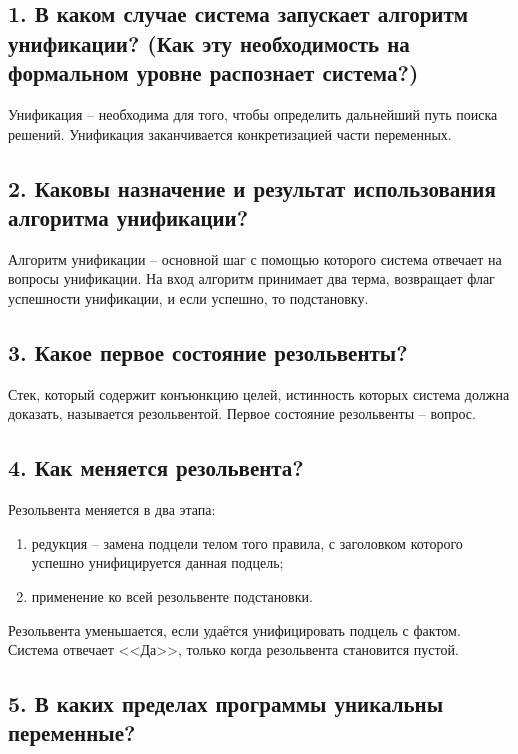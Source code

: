 \subsection*{1. В каком случае система запускает алгоритм унификации? (Как эту необходимость на формальном уровне распознает система?)}

Унификация – необходима для того, чтобы определить дальнейший путь поиска решений. Унификация заканчивается конкретизацией части переменных.

\subsection*{2. Каковы назначение и результат использования алгоритма унификации?}

Алгоритм унификации -- основной шаг с помощью которого система отвечает на вопросы унификации. На вход алгоритм принимает два терма, возвращает флаг успешности унификации, и если успешно, то подстановку.

\subsection*{3. Какое первое состояние резольвенты?}

Стек, который содержит конъюнкцию целей, истинность которых система должна доказать, называется резольвентой. Первое состояние резольвенты -- вопрос.

\subsection*{4. Как меняется резольвента?}

Резольвента меняется в два этапа:

\begin{enumerate}
	\item редукция -- замена подцели телом того правила, с заголовком которого успешно унифицируется данная подцель;
	
	\item применение ко всей резольвенте подстановки.
\end{enumerate}

Резольвента уменьшается, если удаётся унифицировать подцель с фактом. Система отвечает <<Да>>, только когда резольвента становится пустой.

\subsection*{5. В каких пределах программы уникальны переменные?}

